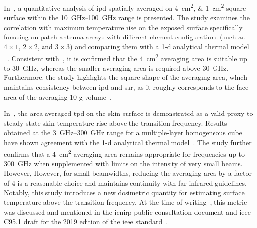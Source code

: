 In~\cite{Funahashi2018Averaging}, a quantitative analysis of \gls{ipd} spatially averaged on \SIlist{4;1}{\cm\squared} square surface within the \SIrange{10}{100}{\GHz} range is presented.
The study examines the correlation with maximum temperature rise on the exposed surface specifically focusing on patch antenna arrays with different element configurations (such as $4 \times 1$, $2 \times 2$, and $3 \times 3$) and comparing them with a \gls{1-d} analytical thermal model ~\cite{Foster2017Thermal}.
Consistent with~\cite{Hashimoto2017averaging}, it is confirmed that the \SI{4}{\cm\squared} averaging area is suitable up to \SI{30}{\GHz}, whereas the smaller averaging area is required above \SI{30}{\GHz}.
Furthermore, the study highlights the square shape of the averaging area, which maintains consistency between \gls{ipd} and \gls{sar}, as it roughly corresponds to the face area of the averaging 10-g volume~\cite{Hirata2019Setting}.

In~\cite{Funahashi2018Area-averaged}, the area-averaged \gls{tpd} on the skin surface is demonstrated as a valid proxy to steady-state skin temperature rise above the transition frequency.
Results obtained at the \SIrange{3}{300}{\GHz} range for a multiple-layer homogeneous cube have shown agreement with the \gls{1-d} analytical thermal model~\cite{Foster2017Thermal}.
The study further confirms that a \SI{4}{\cm\squared} averaging area remains appropriate for frequencies up to \SI{300}{\GHz} when supplemented with limits on the intensity of very small beams.
However, However, for small beamwidths, reducing the averaging area by a factor of \num{4} is a reasonable choice and maintains continuity with far-infrared guidelines.
Notably, this study introduces a new dosimetric quantity for estimating surface temperature above the transition frequency.
At the time of writing~\cite{Funahashi2018Averaging}, this metric was discussed and mentioned in the \gls{icnirp} public consultation document and \gls{ieee} C95.1 draft for the 2019 edition of the \gls{ieee} standard~\cite{IEEE2019Standard}.

